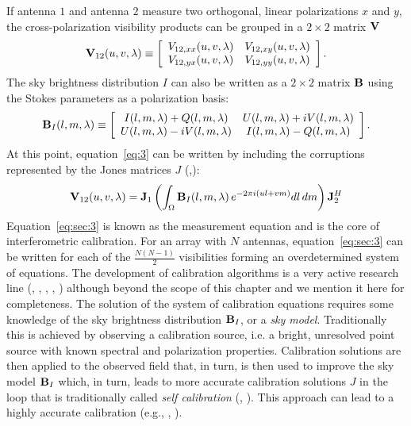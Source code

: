 If antenna $1$ and antenna $2$ measure two orthogonal, linear polarizations $x$ and $y$, the cross-polarization visibility products can be grouped in a $2 \times 2$ matrix ${\bf V}$
\begin{equation}
    {\bf V}_{12} (u,v,\lambda) \equiv 
    \left[ 
    \begin{array}{cc}
    V_{12,xx} (u,v,\lambda) & V_{12,xy} (u,v,\lambda) \\
    V_{12,yx} (u,v,\lambda) & V_{12,yy} (u,v,\lambda) \\
    \end{array}
    \right].   
\label{eq:sec:1}
\end{equation} 
The sky brightness distribution $I$ can also be written as a $2 \times 2$ matrix ${\bf B}$ using the Stokes parameters as a polarization basis:
\begin{equation}
    {\bf B}_I (l,m,\lambda) \equiv 
    \left[
    \begin{array}{cc}
    I (l,m,\lambda) + Q (l,m,\lambda) & U (l,m,\lambda) + iV (l,m,\lambda) \\
    U (l,m,\lambda) - iV (l,m,\lambda) & I (l,m,\lambda) - Q (l,m,\lambda) \\
    \end{array}
    \right].   
\label{eq:sec:2}
\end{equation} 
At this point, equation~\ref{eq:3} can be written by including the corruptions represented by the Jones matrices $J$ (\cite{hamaker96},\cite{smirnov11}):
\begin{equation}
{\bf V}_{12} (u,v,\lambda) = {\bf J}_1 \left( \int_\Omega {\bf B}_I (l, m, \lambda) \, e^{-2 \pi i (ul + vm)} dl \, dm  \right) {\bf J}_2^H
\label{eq:sec:3}
\end{equation} 
Equation~\ref{eq:sec:3} is known as the measurement equation and is the core of interferometric calibration. For an array with $N$ antennas, equation~\ref{eq:sec:3} can be written for each of the $\frac{N (N - 1)}{2}$ visibilities forming an overdetermined system of equations. The development of calibration algorithms is a very active research line (\cite{mitchell08}, \cite{kazemi11}, \cite{tasse14}, \cite{yatawatta15}, \cite{smirnov15}) although beyond the scope of this chapter and we mention it here for completeness.
The solution of the system of calibration equations requires some knowledge of the sky brightness distribution ${\bf B}_I$, or a {\it sky model}. Traditionally this is achieved by observing a calibration source, i.e. a bright, unresolved point source with known spectral and polarization properties. Calibration solutions are then applied to the observed field that, in turn, is then used to improve the sky model ${\bf B}_I$ which, in turn, leads to more accurate calibration solutions $J$ in the loop that is traditionally called {\it self calibration} (\cite{cornwell81}, \cite{pearson84}). This approach can lead to a highly accurate calibration (e.g., \cite{bernardi10}, \cite{smirnov11b}).

